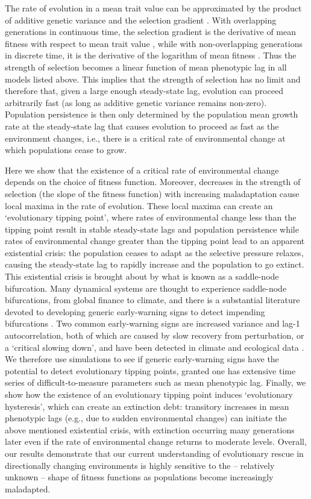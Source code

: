 \documentclass[12pt,letterpaper]{article} %
\begin{document}
The rate of evolution in a mean trait value can be approximated by the product of additive genetic variance and the selection gradient \citep[][]{Lande1976}.
With overlapping generations in continuous time, the selection gradient is the derivative of mean fitness with respect to mean trait value \citep[][equation 11]{Lande1982b}, while with non-overlapping generations in discrete time, it is the derivative of the logarithm of mean fitness \citep[][equation 7]{Lande1976}.
Thus the strength of selection becomes a linear function of mean phenotypic lag in all models listed above. 
This implies that the strength of selection has no limit and therefore that, given a large enough steady-state lag, evolution can proceed arbitrarily fast (as long as additive genetic variance remains non-zero).
Population persistence is then only determined by the population mean growth rate at the steady-state lag that causes evolution to proceed as fast as the environment changes, i.e., there is a critical rate of environmental change at which populations cease to grow.

Here we show that the existence of a critical rate of environmental change depends on the choice of fitness function. 
Moreover, decreases in the strength of selection (the slope of the fitness function) with increasing maladaptation cause local maxima in the rate of evolution.
These local maxima can create an `evolutionary tipping point', where rates of environmental change less than the tipping point result in stable steady-state lags and population persistence while rates of environmental change greater than the tipping point lead to an apparent existential crisis: the population ceases to adapt as the selective pressure relaxes, causing the steady-state lag to rapidly increase and the population to go extinct. 
This existential crisis is brought about by what is known as a saddle-node bifurcation.
Many dynamical systems are thought to experience saddle-node bifurcations, from global finance to climate, and there is a substantial literature devoted to developing generic early-warning signs to detect impending bifurcations \citep[reviewed in][]{Scheffer2009}.
Two common early-warning signs are increased variance and lag-1 autocorrelation, both of which are caused by slow recovery from perturbation, or a `critical slowing down', and have been detected in climate and ecological data \citep{Scheffer2009,Lenton2011}.
We therefore use simulations to see if generic early-warning signs have the potential to detect evolutionary tipping points, granted one has extensive time series of difficult-to-measure parameters such as mean phenotypic lag.
Finally, we show how the existence of an evolutionary tipping point induces `evolutionary hysteresis', which can create an extinction debt: transitory increases in mean phenotypic lags (e.g., due to sudden environmental changes) can initiate the above mentioned existential crisis, with extinction occurring many generations later even if the rate of environmental change returns to moderate levels.
Overall, our results demonstrate that our current understanding of evolutionary rescue in directionally changing environments is highly sensitive to the -- relatively unknown -- shape of fitness functions as populations become increasingly maladapted.
\end{document}
